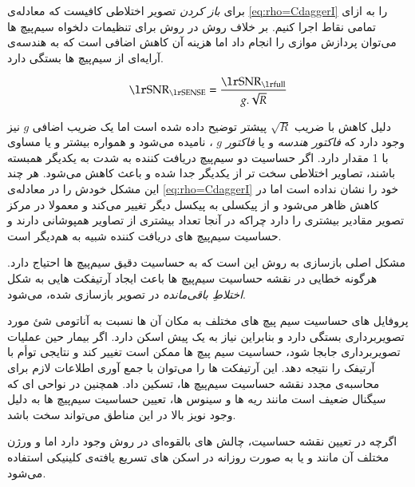 برای \textit{باز کردن}
تصویر اختلاطی کافیست که معادله‌ی \ref{eq:rho=CdaggerI}
را به ازای تمامی نقاط اجرا کنیم. بر خلاف روش 
در روش 
برای تنظیمات دلخواه سیم‌پیچ ها می‌توان پردازش موازی را انجام داد اما هزینه آن کاهش اضافی  است که به هندسه‌ی آرایه‌ای از سیم‌پیچ ها بستگی دارد. 
\cite{SMASH-SENSE-PILS-GRAPPA--2004}

\removevspace
\begin{equation}
	\lrtext{SNR}_{\lrtext{SENSE}} = \dfrac{\lrtext{SNR}_{\lrtext{full}}}{g.\sqrt{R}} 
\end{equation}

دلیل کاهش  با ضریب $\sqrt{R}$ پیشتر توضیح داده شده است اما یک ضریب اضافی $g$ نیز وجود دارد که 
\textit{فاکتور هندسه}
و یا \textit{فاکتور $g$}
، نامیده می‌شود و همواره بیشتر و یا مساوی با 1 مقدار دارد. اگر حساسیت دو سیم‌پیچ دریافت کننده به شدت به یکدیگر همبسته باشند، تصاویر اختلاطی سخت تر از یکدیگر جدا شده و باعث کاهش 
 می‌شود. هر چند این مشکل خودش را در معادله‌ی \ref{eq:rho=CdaggerI}
خود را نشان نداده است اما در کاهش 
ظاهر می‌شود و از پیکسلی به پیکسل دیگر تغییر می‌کند و معمولا در مرکز تصویر مقادیر بیشتری را دارد چراکه در آنجا تعداد بیشتری از تصاویر همپوشانی دارند و حساسیت سیم‌پیچ های دریافت کننده شبیه به هم‌دیگر است.


مشکل اصلی بازسازی به روش 
این است که به حساسیت دقیق سیم‌پیچ ها احتیاج دارد. هرگونه خطایی در نقشه حساسیت سیم‌پیچ ها باعث ایجاد آرتیفکت هایی به شکل \textit{اختلاطِ باقی‌مانده} در تصویر بازسازی شده، می‌شود.
\cite{ParallelMRImaging2012}

پروفایل های حساسیت سیم پیچ های مختلف به مکان آن ها نسبت به آناتومی شئ مورد تصویربرداری  بستگی دارد و بنابراین نیاز به یک پیش اسکن دارد.
اگر بیمار حین عملیات تصویربرداری جابجا شود، حساسیت سیم پیچ ها ممکن است تغییر کند و نتایجی توأم با آرتیفک را نتیجه دهد.
این آرتیفکت ها را می‌توان با جمع آوری اطلاعات لازم برای محاسبه‌ی مجدد نقشه حساسیت سیم‌پیچ ها، تسکین داد. همچنین در نواحی ای که سیگنال ضعیف است مانند ریه ها و سینوس ها، تعیین حساسیت سیم‌پیچ ها به دلیل وجود نویز بالا در این مناطق می‌تواند سخت باشد.

اگرچه در تعیین نقشه حساسیت، چالش های بالقوه‌ای در روش 
وجود دارد اما 
و ورژن مختلف آن مانند 
و یا 
به صورت روزانه در اسکن های تسریع یافته‌ی کلینیکی استفاده می‌شود.

\FloatBarrier
\subsection{}

